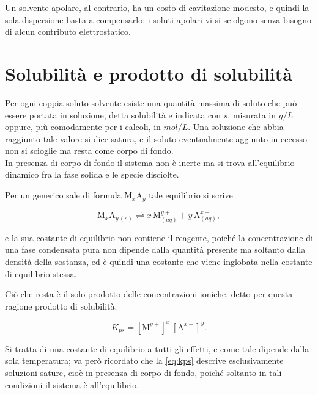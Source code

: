 Un solvente apolare, al contrario, ha un costo di cavitazione modesto, e quindi la sola dispersione basta a compensarlo: i soluti apolari vi si sciolgono senza bisogno di alcun contributo elettrostatico.

\newpage

\section{Solubilità e prodotto di solubilità}

Per ogni coppia soluto-solvente esiste una quantità massima di soluto che può essere portata in soluzione, detta solubilità e indicata con $s$, misurata in $g/L$ oppure, più comodamente per i calcoli, in $mol/L$.
Una soluzione che abbia raggiunto tale valore si dice satura, e il soluto eventualmente aggiunto in eccesso non si scioglie ma resta come corpo di fondo.\\

In presenza di corpo di fondo il sistema non è inerte ma si trova all'equilibrio dinamico fra la fase solida e le specie disciolte.

Per un generico sale di formula $\mathrm{M}_x\mathrm{A}_y$ tale equilibrio si scrive

\begin{equation}
    \mathrm{M}_x\mathrm{A}_{y\,(s)} \rightleftharpoons x\,\mathrm{M}^{y+}_{(aq)} + y\,\mathrm{A}^{x-}_{(aq)} ,
    \label{eq:equilibrio_sale}
\end{equation}

e la sua costante di equilibrio non contiene il reagente, poiché la concentrazione di una fase condensata pura non dipende dalla quantità presente ma soltanto dalla densità della sostanza, ed è quindi una costante che viene inglobata nella costante di equilibrio stessa.

Ciò che resta è il solo prodotto delle concentrazioni ioniche, detto per questa ragione prodotto di solubilità:

\begin{equation}
    K_{ps} = [\mathrm{M}^{y+}]^x\,[\mathrm{A}^{x-}]^y .
    \label{eq:kps}
\end{equation}

Si tratta di una costante di equilibrio a tutti gli effetti, e come tale dipende dalla sola temperatura; va però ricordato che la \eqref{eq:kps} descrive esclusivamente soluzioni sature, cioè in presenza di corpo di fondo, poiché soltanto in tali condizioni il sistema è all'equilibrio.\\

